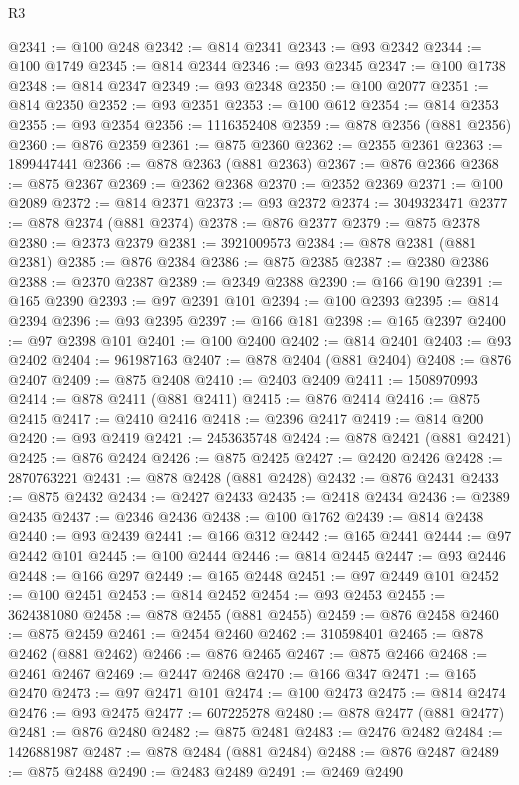 \begin{lexlean}{R3}
\begin{coremodule}
@2341 := @100 @248
@2342 := @814 @2341
@2343 := @93 @2342
@2344 := @100 @1749
@2345 := @814 @2344
@2346 := @93 @2345
@2347 := @100 @1738
@2348 := @814 @2347
@2349 := @93 @2348
@2350 := @100 @2077
@2351 := @814 @2350
@2352 := @93 @2351
@2353 := @100 @612
@2354 := @814 @2353
@2355 := @93 @2354
@2356 := 1116352408
@2359 := @878 @2356 (@881 @2356)
@2360 := @876 @2359
@2361 := @875 @2360
@2362 := @2355 @2361
@2363 := 1899447441
@2366 := @878 @2363 (@881 @2363)
@2367 := @876 @2366
@2368 := @875 @2367
@2369 := @2362 @2368
@2370 := @2352 @2369
@2371 := @100 @2089
@2372 := @814 @2371
@2373 := @93 @2372
@2374 := 3049323471
@2377 := @878 @2374 (@881 @2374)
@2378 := @876 @2377
@2379 := @875 @2378
@2380 := @2373 @2379
@2381 := 3921009573
@2384 := @878 @2381 (@881 @2381)
@2385 := @876 @2384
@2386 := @875 @2385
@2387 := @2380 @2386
@2388 := @2370 @2387
@2389 := @2349 @2388
@2390 := @166 @190
@2391 := @165 @2390
@2393 := @97 @2391 @101
@2394 := @100 @2393
@2395 := @814 @2394
@2396 := @93 @2395
@2397 := @166 @181
@2398 := @165 @2397
@2400 := @97 @2398 @101
@2401 := @100 @2400
@2402 := @814 @2401
@2403 := @93 @2402
@2404 := 961987163
@2407 := @878 @2404 (@881 @2404)
@2408 := @876 @2407
@2409 := @875 @2408
@2410 := @2403 @2409
@2411 := 1508970993
@2414 := @878 @2411 (@881 @2411)
@2415 := @876 @2414
@2416 := @875 @2415
@2417 := @2410 @2416
@2418 := @2396 @2417
@2419 := @814 @200
@2420 := @93 @2419
@2421 := 2453635748
@2424 := @878 @2421 (@881 @2421)
@2425 := @876 @2424
@2426 := @875 @2425
@2427 := @2420 @2426
@2428 := 2870763221
@2431 := @878 @2428 (@881 @2428)
@2432 := @876 @2431
@2433 := @875 @2432
@2434 := @2427 @2433
@2435 := @2418 @2434
@2436 := @2389 @2435
@2437 := @2346 @2436
@2438 := @100 @1762
@2439 := @814 @2438
@2440 := @93 @2439
@2441 := @166 @312
@2442 := @165 @2441
@2444 := @97 @2442 @101
@2445 := @100 @2444
@2446 := @814 @2445
@2447 := @93 @2446
@2448 := @166 @297
@2449 := @165 @2448
@2451 := @97 @2449 @101
@2452 := @100 @2451
@2453 := @814 @2452
@2454 := @93 @2453
@2455 := 3624381080
@2458 := @878 @2455 (@881 @2455)
@2459 := @876 @2458
@2460 := @875 @2459
@2461 := @2454 @2460
@2462 := 310598401
@2465 := @878 @2462 (@881 @2462)
@2466 := @876 @2465
@2467 := @875 @2466
@2468 := @2461 @2467
@2469 := @2447 @2468
@2470 := @166 @347
@2471 := @165 @2470
@2473 := @97 @2471 @101
@2474 := @100 @2473
@2475 := @814 @2474
@2476 := @93 @2475
@2477 := 607225278
@2480 := @878 @2477 (@881 @2477)
@2481 := @876 @2480
@2482 := @875 @2481
@2483 := @2476 @2482
@2484 := 1426881987
@2487 := @878 @2484 (@881 @2484)
@2488 := @876 @2487
@2489 := @875 @2488
@2490 := @2483 @2489
@2491 := @2469 @2490

\end{coremodule}
\end{lexlean}
